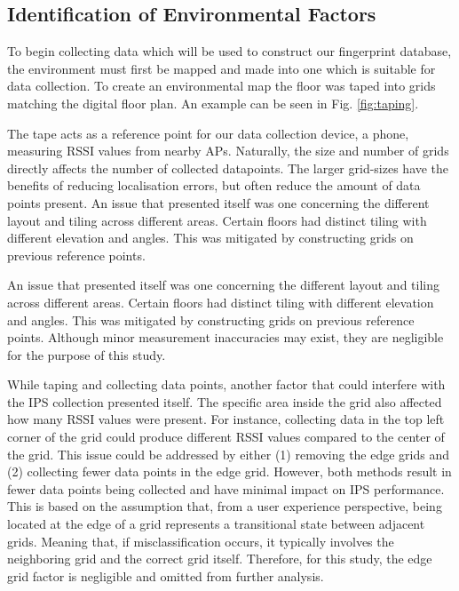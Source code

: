 \documentclass[runningheads]{llncs}
\begin{document}
\subsection{Identification of Environmental Factors}
To begin collecting data which will be used to construct our fingerprint database, the environment must first be mapped and made into one which is suitable for data collection. To create an environmental map the floor was taped into grids matching the digital floor plan. An example can be seen in Fig. \ref{fig:taping}. 

The tape acts as a reference point for our data collection device, a phone, measuring RSSI values from nearby APs. Naturally, the size and number of grids directly affects the number of collected datapoints. The larger grid-sizes have the benefits of reducing localisation errors, but often reduce the amount of data points present. An issue that presented itself was one concerning the different layout and tiling across different areas. Certain floors had distinct tiling with different elevation and angles. This was mitigated by constructing grids on previous reference points. 


An issue that presented itself was one concerning the different layout and tiling across different areas. Certain floors had distinct tiling with different elevation and angles. This was mitigated by constructing grids on previous reference points. Although minor measurement inaccuracies may exist, they are negligible for the purpose of this study.

While taping and collecting data points, another factor that could interfere with the IPS collection presented itself. The specific area inside the grid also affected how many RSSI values were present. For instance, collecting data in the top left corner of the grid could produce different RSSI values compared to the center of the grid. This issue could be addressed by either (1) removing the edge grids and (2) collecting fewer data points in the edge grid. However, both methods result in fewer data points being collected and have minimal impact on IPS performance. This is based on the assumption that, from a user experience perspective, being located at the edge of a grid represents a transitional state between adjacent grids. Meaning that, if misclassification occurs, it typically involves the neighboring grid and the correct grid itself. Therefore, for this study, the edge grid factor is negligible and omitted from further analysis.
\end{document}
